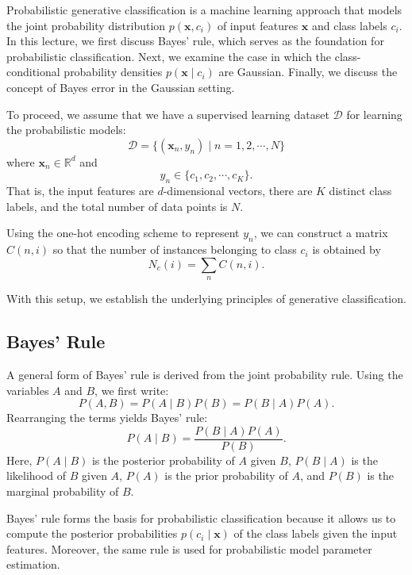 \documentclass[12pt]{article}
\begin{document}
Probabilistic generative classification is a machine learning approach that models the joint probability distribution \(p(\bm{x}, c_i)\) of input features \(\bm{x}\) and class labels \(c_i\). In this lecture, we first discuss Bayes' rule, which serves as the foundation for probabilistic classification. Next, we examine the case in which the class-conditional probability densities \(p(\bm{x} \mid c_i)\) are Gaussian. Finally, we discuss the concept of Bayes error in the Gaussian setting.

To proceed, we assume that we have a supervised learning dataset \(\mathcal{D}\) for learning the probabilistic models:
\[
\mathcal{D} = \{(\bm{x}_n, y_n) \mid n = 1, 2, \cdots, N \}
\]
where \(\bm{x}_n \in \mathbb{R}^d\) and 
\[
y_n \in \{c_1, c_2, \cdots, c_K\}.
\]
That is, the input features are \(d\)-dimensional vectors, there are \(K\) distinct class labels, and the total number of data points is \(N\).

Using the one-hot encoding scheme to represent \(y_n\), we can construct a matrix \(C(n,i)\) so that the number of instances belonging to class \(c_i\) is obtained by
\[
N_c(i) = \sum_{n} C(n,i).
\]

With this setup, we establish the underlying principles of generative classification.

\subsection{Bayes' Rule}
A general form of Bayes' rule is derived from the joint probability rule. Using the variables \(A\) and \(B\), we first write:
\begin{equation}
P(A, B) = P(A \mid B)P(B) = P(B \mid A)P(A).
\end{equation}
Rearranging the terms yields Bayes' rule:
\begin{equation}
P(A \mid B) = \frac{P(B \mid A)P(A)}{P(B)}.
\end{equation}
Here, \(P(A \mid B)\) is the posterior probability of \(A\) given \(B\), \(P(B \mid A)\) is the likelihood of \(B\) given \(A\), \(P(A)\) is the prior probability of \(A\), and \(P(B)\) is the marginal probability of \(B\).

Bayes' rule forms the basis for probabilistic classification because it allows us to compute the posterior probabilities \(p(c_i \mid \bm{x})\) of the class labels given the input features. Moreover, the same rule is used for probabilistic model parameter estimation.
\end{document}
